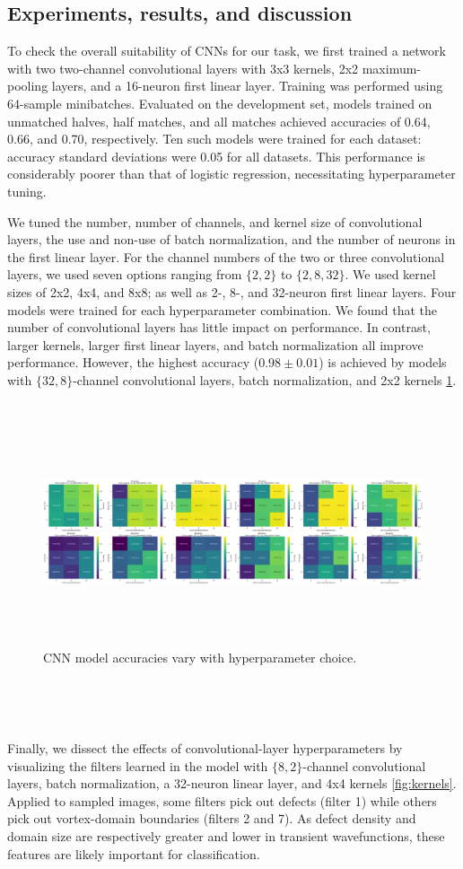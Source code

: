 \documentclass[nofootinbib,pre,superscriptaddress,twocolumn,longbibliography,floatfix]{revtex4-2}
\begin{document}
\subsection{Experiments, results, and discussion}
To check the overall suitability of CNNs for our task, we first trained a network with two two-channel convolutional layers with 3x3 kernels,
2x2 maximum-pooling layers, and a 16-neuron first linear layer.
Training was performed using 64-sample minibatches.
Evaluated on the development set, models trained on unmatched halves, half matches, and all matches achieved accuracies of 0.64, 0.66, and 0.70, respectively.
Ten such models were trained for each dataset: accuracy standard deviations were 0.05 for all datasets.
This performance is considerably poorer than that of logistic regression, necessitating hyperparameter tuning.

We tuned the number, number of channels, and kernel size of convolutional layers,
the use and non-use of batch normalization, and the number of neurons in the first linear layer.
For the channel numbers of the two or three convolutional layers, we used seven options ranging from $\{2, 2\}$ to $\{2, 8, 32\}$.
We used kernel sizes of 2x2, 4x4, and 8x8; as well as 2-, 8-, and 32-neuron first linear layers.
Four models were trained for each hyperparameter combination.
We found that the number of convolutional layers has little impact on performance.
In contrast, larger kernels, larger first linear layers, and batch normalization all improve performance.
However, the highest accuracy ($0.98\pm 0.01$) is achieved by models with $\{32, 8\}$-channel convolutional layers, batch normalization, and 2x2 kernels \ref{fig:cnn_accuracies}.

\onecolumngrid\
\begin{center}\
\begin{figure}[h!]\
\includegraphics[scale=0.19]{../figures/B_new.png}\
\caption{CNN model accuracies vary with hyperparameter choice.}\
\label{fig:cnn_accuracies}
\end{figure}\
\end{center}\
\twocolumngrid\

Finally, we dissect the effects of convolutional-layer hyperparameters by visualizing the filters learned in the model with $\{8, 2\}$-channel convolutional layers,
batch normalization, a 32-neuron linear layer, and 4x4 kernels \ref{fig:kernels}.
Applied to sampled images, some filters pick out defects (filter 1) while others pick out vortex-domain boundaries (filters 2 and 7).
As defect density and domain size are respectively greater and lower in transient wavefunctions,
these features are likely important for classification.
\end{document}
